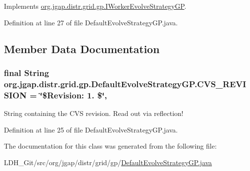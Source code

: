 Implements \hyperlink{interfaceorg_1_1jgap_1_1distr_1_1grid_1_1gp_1_1_i_worker_evolve_strategy_g_p_a7ef9cbf73d6aa09c0e7e0886c7c50a61}{org.\-jgap.\-distr.\-grid.\-gp.\-I\-Worker\-Evolve\-Strategy\-G\-P}.



Definition at line 27 of file Default\-Evolve\-Strategy\-G\-P.\-java.



\subsection{Member Data Documentation}
\hypertarget{classorg_1_1jgap_1_1distr_1_1grid_1_1gp_1_1_default_evolve_strategy_g_p_a84a173efe0853eec56d63eeabc43a945}{
\subsubsection[{C\-V\-S\-\_\-\-R\-E\-V\-I\-S\-I\-O\-N}]{\setlength{\rightskip}{0pt plus 5cm}final String org.\-jgap.\-distr.\-grid.\-gp.\-Default\-Evolve\-Strategy\-G\-P.\-C\-V\-S\-\_\-\-R\-E\-V\-I\-S\-I\-O\-N = \char`\"{}\$Revision\-: 1. \$\char`\"{}\hspace{0.3cm}{\ttfamily [static]}, {\ttfamily [private]}}}\label{classorg_1_1jgap_1_1distr_1_1grid_1_1gp_1_1_default_evolve_strategy_g_p_a84a173efe0853eec56d63eeabc43a945}
String containing the C\-V\-S revision. Read out via reflection! 

Definition at line 25 of file Default\-Evolve\-Strategy\-G\-P.\-java.



The documentation for this class was generated from the following file\-:\begin{DoxyCompactItemize}
\item 
L\-D\-H\-\_\-\-Git/src/org/jgap/distr/grid/gp/\hyperlink{_default_evolve_strategy_g_p_8java}{Default\-Evolve\-Strategy\-G\-P.\-java}\end{DoxyCompactItemize}

